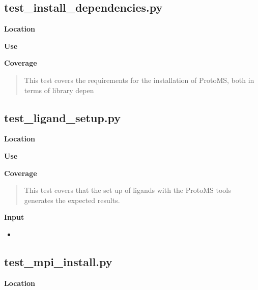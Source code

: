 \documentclass[letterpaper,10pt,english]{manual}
\begin{document}
\subsection{test\_install\_dependencies.py}

\textbf{Location}
\begin{quote}

\end{quote}

\textbf{Use}
\begin{quote}

\end{quote}

\textbf{Coverage}
\begin{quote}

This test covers the requirements for the installation of ProtoMS, both in terms of library depen
\end{quote}


\subsection{test\_ligand\_setup.py}

\textbf{Location}
\begin{quote}

\end{quote}

\textbf{Use}
\begin{quote}

\end{quote}

\textbf{Coverage}
\begin{quote}

This test covers that the set up of ligands with the ProtoMS tools generates the expected results.
\end{quote}

\textbf{Input}
\begin{itemize}
\item {} 

\end{itemize}


\subsection{test\_mpi\_install.py}

\textbf{Location}
\begin{quote}

\end{quote}
\end{document}
